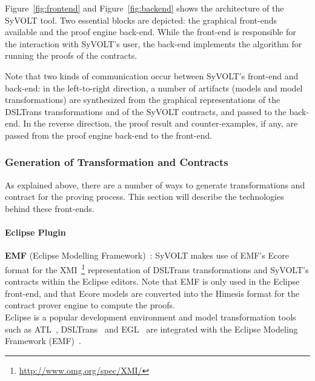 Figure~\ref{fig:frontend}  and Figure~\ref{fig:backend} shows the
architecture of the SyVOLT tool. Two essential blocks are depicted: the
graphical front-ends available and the proof engine back-end. While the front-end
is responsible for the interaction with SyVOLT's user, the back-end implements
the algorithm for running the proofs of the contracts.

Note that two kinds of communication occur between SyVOLT's front-end and back-end: in the
left-to-right direction, a number of artifacts (models and model
transformations) are synthesized from the graphical representations of the
DSLTrans transformations and of the SyVOLT contracts, and passed to the
back-end. In the reverse direction, the proof result and counter-examples, if
any, are passed from the proof engine back-end to the front-end.


\subsubsection{Generation of Transformation and Contracts}

As explained above, there are a number of ways to generate transformations and contract for the proving process. This section will describe the technologies behind these front-ends.
  
\paragraph{Eclipse Plugin}

 \textbf{EMF} (Eclipse Modelling Framework)~\cite{emfTool}: SyVOLT makes
  use of EMF's Ecore format for the
  XMI~\footnote{\url{http://www.omg.org/spec/XMI/}} representation of DSLTrans
  transformations and SyVOLT's contracts within the Eclipse editors.
  Note that EMF is only used in the Eclipse front-end, and that Ecore models are converted
  into the Himesis format for the contract prover engine to compute the
  proofs.\\
  
  
  Eclipse is a popular development environment and model
  transformation tools such as ATL~\cite{atlTool}, DSLTrans~\cite{Barroca2011} and
  EGL~\cite{eglTool} are integrated with the Eclipse Modeling Framework
  (EMF)~\cite{emfTool}.
  
